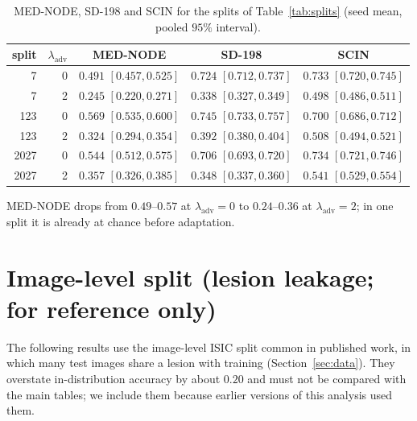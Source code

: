 \documentclass{midl}
\newcommand{\lam}{\lambda_{\mathrm{adv}}}
\begin{document}
\begin{table}[h]
\centering
\caption{MED-NODE, SD-198 and SCIN for the splits of Table~\ref{tab:splits} (seed mean, pooled $95\%$ interval).}
\label{tab:splits-b}
\begin{tabular}{rrccc}
\toprule
split & $\lam$ & MED-NODE & SD-198 & SCIN \\
\midrule
7 & 0 & $0.491$ $[0.457, 0.525]$ & $0.724$ $[0.712, 0.737]$ & $0.733$ $[0.720, 0.745]$ \\
7 & 2 & $0.245$ $[0.220, 0.271]$ & $0.338$ $[0.327, 0.349]$ & $0.498$ $[0.486, 0.511]$ \\
123 & 0 & $0.569$ $[0.535, 0.600]$ & $0.745$ $[0.733, 0.757]$ & $0.700$ $[0.686, 0.712]$ \\
123 & 2 & $0.324$ $[0.294, 0.354]$ & $0.392$ $[0.380, 0.404]$ & $0.508$ $[0.494, 0.521]$ \\
2027 & 0 & $0.544$ $[0.512, 0.575]$ & $0.706$ $[0.693, 0.720]$ & $0.734$ $[0.721, 0.746]$ \\
2027 & 2 & $0.357$ $[0.326, 0.385]$ & $0.348$ $[0.337, 0.360]$ & $0.541$ $[0.529, 0.554]$ \\
\bottomrule
\end{tabular}
\end{table}


MED-NODE drops from $0.49$--$0.57$ at $\lam=0$ to $0.24$--$0.36$ at $\lam=2$; in one split it is already at chance
before adaptation.

\FloatBarrier
\section{Image-level split (lesion leakage; for reference only)}
\label{app:imagelevel}

The following results use the image-level ISIC split common in published work, in which
many test images share a lesion with training (Section~\ref{sec:data}). They overstate in-distribution accuracy
by about $0.20$ and must not be compared with the main tables; we include them because earlier
versions of this analysis used them.
\end{document}
